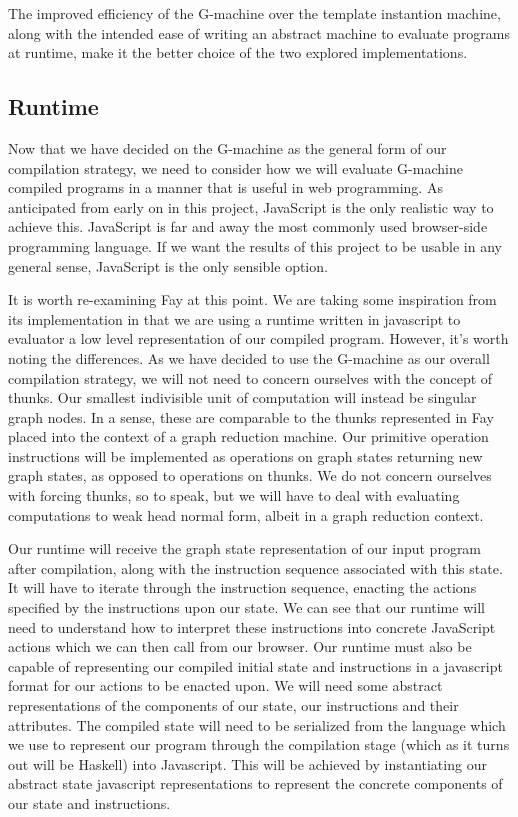 The improved efficiency of the G-machine over the template
instantion machine, along with the intended ease of writing
an abstract machine to evaluate programs at runtime, make
it the better choice of the two explored implementations.

\subsection{Runtime}
Now that we have decided on the G-machine as the general
form of our compilation strategy, we need to consider how
we will evaluate G-machine compiled programs in a manner
that is useful in web programming. As anticipated from
early on in this project, JavaScript is the only realistic
way to achieve this. JavaScript is far and away the most
commonly used browser-side programming language. If we
want the results of this project to be usable in any
general sense, JavaScript is the only sensible option.

It is worth re-examining Fay at this point. We are
taking some inspiration from its implementation in
that we are using a runtime written in javascript to 
evaluator a low level representation of our compiled
program. However, it's worth noting the differences.
As we have decided to use the G-machine as our overall
compilation strategy, we 
will not need to concern ourselves with the
concept of thunks. Our smallest indivisible unit of
computation will instead be singular graph nodes. 
In a sense, these are comparable to the thunks
represented in Fay placed into the context of a graph
reduction machine. Our primitive operation instructions
will be implemented as operations on graph states
returning new graph states, as opposed to operations on 
thunks. We do not concern ourselves with forcing thunks, 
so to speak, but we will have to deal with evaluating 
computations to weak head normal form, albeit in a 
graph reduction context.

Our runtime will receive the graph state representation
of our input program after compilation, along with the
instruction sequence associated with this state. It will
have to iterate through the instruction sequence, enacting
the actions specified by the instructions upon our state.
We can see that our runtime will need to understand how
to interpret these instructions into concrete JavaScript
actions which we can then call from our browser. Our 
runtime must also be capable of representing our compiled
initial state and instructions in a javascript format 
for our actions to be enacted upon. We will 
need some abstract representations of the components of
our state, our instructions and their attributes. The
compiled state will need to be serialized from the 
language which we use to represent our program through
the compilation stage (which as it turns out will be
Haskell) into Javascript. This will be achieved by
instantiating our abstract state javascript
representations to represent the concrete components of
our state and instructions.

